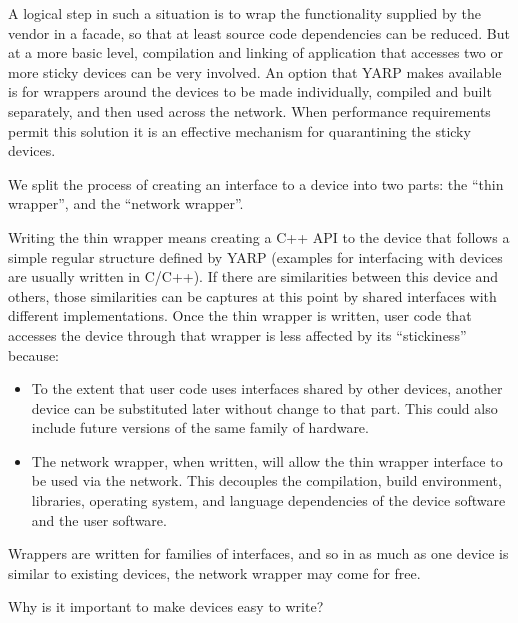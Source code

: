 A logical step in such a situation is to wrap the functionality
supplied by the vendor in a facade, so that at least source code
dependencies can be reduced.  But at a more basic level,
compilation and linking of application that accesses two or more
sticky devices can be very involved.  An option that YARP makes
available is for wrappers around the devices to be made individually,
compiled and built separately, and then used across the network.
When performance requirements permit this solution it is an
effective mechanism for quarantining the sticky devices.

We split the process of creating an interface to a device into two
parts: the ``thin wrapper'', and the ``network wrapper''.  

Writing the thin wrapper means creating a C++ API to the device
that follows a simple regular structure defined by YARP
(examples for interfacing with devices are usually written in C/C++).
If there are similarities between this device and others,
those similarities can be captures at this point by 
shared interfaces with different implementations.
Once the thin wrapper is written, user code that accesses
the device through that wrapper is less affected by its ``stickiness''
because:

\begin{itemize}

\item To the extent that user code uses interfaces shared by other
devices, another device can be substituted later without change to
that part.  This could also include future versions of the same family
of hardware.

\item The network wrapper, when written, will allow the thin wrapper
interface to be used via the network.  This decouples the compilation,
build environment, libraries, operating system, and language
dependencies of the device software and the user software.

\end{itemize}

Wrappers are written for families of interfaces, and so in as much
as one device is similar to existing devices, the network 
wrapper may come for free.

Why is it important to make devices easy to write?

